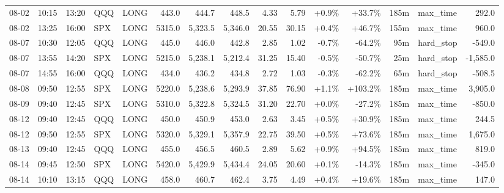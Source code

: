 \documentclass[11pt,a4paper,twoside]{article}
\begin{document}
\begin{landscape}
\begin{center}
\begin{longtable}{>{\color{txtmain}}l l l l l r r r r r r r r >{\color{txtmain}}l r}
08-02 & 10:15 & 13:20 & QQQ & LONG & 443.0 & 444.7 & 448.5 & 4.33 & 5.79 & \textcolor{wingreen}{+0.9\%} & \textcolor{wingreen}{+33.7\%} & 185m & max\_time & \textcolor{wingreen}{292.0} \\
08-02 & 13:25 & 16:00 & SPX & LONG & 5315.0 & 5,323.5 & 5,346.0 & 20.55 & 30.15 & \textcolor{wingreen}{+0.4\%} & \textcolor{wingreen}{+46.7\%} & 155m & max\_time & \textcolor{wingreen}{960.0} \\
08-07 & 10:30 & 12:05 & QQQ & LONG & 445.0 & 446.0 & 442.8 & 2.85 & 1.02 & \textcolor{lossred}{-0.7\%} & \textcolor{lossred}{-64.2\%} & 95m & hard\_stop & \textcolor{lossred}{-549.0} \\
08-07 & 13:55 & 14:20 & SPX & LONG & 5215.0 & 5,238.1 & 5,212.4 & 31.25 & 15.40 & \textcolor{lossred}{-0.5\%} & \textcolor{lossred}{-50.7\%} & 25m & hard\_stop & \textcolor{lossred}{-1,585.0} \\
08-07 & 14:55 & 16:00 & QQQ & LONG & 434.0 & 436.2 & 434.8 & 2.72 & 1.03 & \textcolor{lossred}{-0.3\%} & \textcolor{lossred}{-62.2\%} & 65m & hard\_stop & \textcolor{lossred}{-508.5} \\
08-08 & 09:50 & 12:55 & SPX & LONG & 5220.0 & 5,238.6 & 5,293.9 & 37.85 & 76.90 & \textcolor{wingreen}{+1.1\%} & \textcolor{wingreen}{+103.2\%} & 185m & max\_time & \textcolor{wingreen}{3,905.0} \\
08-09 & 09:40 & 12:45 & SPX & LONG & 5310.0 & 5,322.8 & 5,324.5 & 31.20 & 22.70 & \textcolor{wingreen}{+0.0\%} & \textcolor{lossred}{-27.2\%} & 185m & max\_time & \textcolor{lossred}{-850.0} \\
08-12 & 09:40 & 12:45 & QQQ & LONG & 450.0 & 450.9 & 453.0 & 2.63 & 3.45 & \textcolor{wingreen}{+0.5\%} & \textcolor{wingreen}{+30.9\%} & 185m & max\_time & \textcolor{wingreen}{244.5} \\
08-12 & 09:50 & 12:55 & SPX & LONG & 5320.0 & 5,329.1 & 5,357.9 & 22.75 & 39.50 & \textcolor{wingreen}{+0.5\%} & \textcolor{wingreen}{+73.6\%} & 185m & max\_time & \textcolor{wingreen}{1,675.0} \\
08-13 & 09:40 & 12:45 & QQQ & LONG & 455.0 & 456.5 & 460.5 & 2.89 & 5.62 & \textcolor{wingreen}{+0.9\%} & \textcolor{wingreen}{+94.5\%} & 185m & max\_time & \textcolor{wingreen}{819.0} \\
08-14 & 09:45 & 12:50 & SPX & LONG & 5420.0 & 5,429.9 & 5,434.4 & 24.05 & 20.60 & \textcolor{wingreen}{+0.1\%} & \textcolor{lossred}{-14.3\%} & 185m & max\_time & \textcolor{lossred}{-345.0} \\
08-14 & 10:10 & 13:15 & QQQ & LONG & 458.0 & 460.7 & 462.4 & 3.75 & 4.49 & \textcolor{wingreen}{+0.4\%} & \textcolor{wingreen}{+19.6\%} & 185m & max\_time & \textcolor{wingreen}{147.0} \\

\end{longtable}
\end{center}
\end{landscape}
\end{document}
